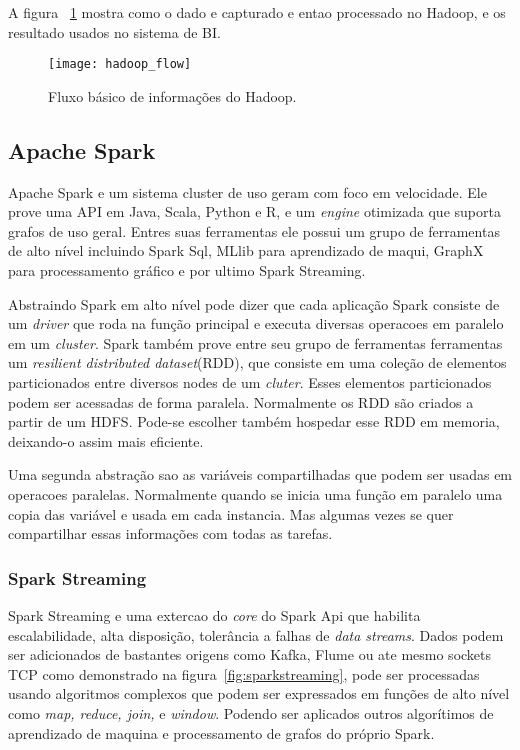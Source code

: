 A figura ~\ref{fig:hadoopflow} mostra como o dado e capturado e entao processado no Hadoop, e os resultado usados no sistema de BI.~\cite{hadoopessentials}

\begin{figure}[!h]
	\caption{\label{fig:hadoopflow} Fluxo básico de informações do Hadoop.}
	\begin{center}
		\texttt{[image: hadoop\_flow]}
	\end{center}
\end{figure}


\subsection{Apache Spark}
Apache Spark e um sistema cluster de uso geram com foco em velocidade. Ele prove uma API em Java, Scala, Python e R, e um \textit{engine} otimizada que suporta grafos de uso geral. Entres suas ferramentas ele possui um grupo de ferramentas de alto nível incluindo Spark Sql, MLlib para aprendizado de maqui, GraphX para processamento gráfico e por ultimo Spark Streaming.

Abstraindo Spark em alto nível pode dizer que cada aplicação Spark consiste de um \textit{driver} que roda na função principal e executa diversas operacoes em paralelo em um \textit{cluster}. Spark também prove entre seu grupo de ferramentas ferramentas um \textit{resilient distributed dataset}(RDD), que consiste em uma coleção de elementos particionados entre diversos nodes de um \textit{cluter}. Esses elementos particionados podem ser acessadas de forma paralela. Normalmente os RDD são criados a partir de um HDFS. Pode-se escolher também hospedar esse RDD em memoria, deixando-o assim mais eficiente.

Uma segunda abstração sao as variáveis compartilhadas que podem ser usadas em operacoes paralelas. Normalmente quando se inicia uma função em paralelo uma copia das variável e usada em cada instancia. Mas algumas vezes se quer compartilhar essas informações com todas as tarefas.

\subsubsection{Spark Streaming}
Spark Streaming e uma extercao do \textit{core} do Spark Api que habilita escalabilidade, alta disposição, tolerância a falhas de \textit{data streams}. Dados podem ser adicionados de bastantes origens  como Kafka, Flume ou ate mesmo sockets TCP como demonstrado na figura~\ref{fig:sparkstreaming}, pode ser processadas usando algoritmos complexos que podem ser expressados em funções de alto nível como \textit{map, reduce, join,} e \textit{window}. Podendo ser aplicados outros algorítimos de aprendizado de maquina e processamento de grafos do próprio Spark.~\cite{sparkstreaming}


